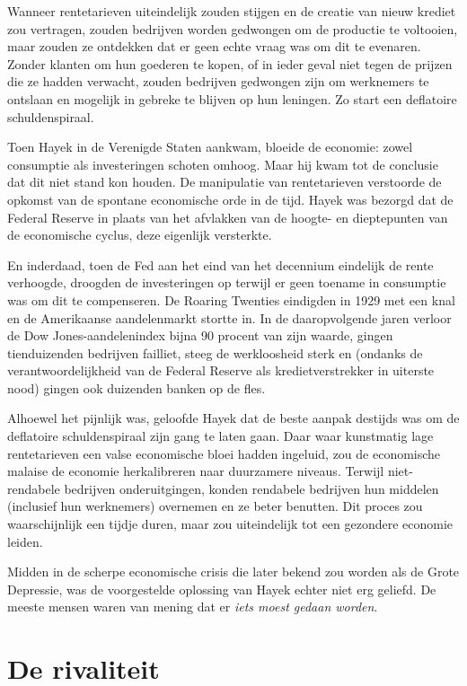 \documentclass[
  a5paper,
  smalldemyvopaper,11pt,twoside,onecolumn,openright,extrafontsizes]{memoir}
\begin{document}
Wanneer rentetarieven uiteindelijk zouden stijgen en de creatie van
nieuw krediet zou vertragen, zouden bedrijven worden gedwongen om de
productie te voltooien, maar zouden ze ontdekken dat er geen echte vraag
was om dit te evenaren. Zonder klanten om hun goederen te kopen, of in
ieder geval niet tegen de prijzen die ze hadden verwacht, zouden
bedrijven gedwongen zijn om werknemers te ontslaan en mogelijk in
gebreke te blijven op hun leningen. Zo start een deflatoire
schuldenspiraal.

Toen Hayek in de Verenigde Staten aankwam, bloeide de economie: zowel
consumptie als investeringen schoten omhoog. Maar hij kwam tot de
conclusie dat dit niet stand kon houden. De manipulatie van
rentetarieven verstoorde de opkomst van de spontane economische orde in
de tijd. Hayek was bezorgd dat de Federal Reserve in plaats van het
afvlakken van de hoogte- en dieptepunten van de economische cyclus, deze
eigenlijk versterkte.

En inderdaad, toen de Fed aan het eind van het decennium eindelijk de
rente verhoogde, droogden de investeringen op terwijl er geen toename in
consumptie was om dit te compenseren. De Roaring Twenties eindigden in
1929 met een knal en de Amerikaanse aandelenmarkt stortte in. In de
daaropvolgende jaren verloor de Dow Jones-aandelenindex bijna 90 procent
van zijn waarde, gingen tienduizenden bedrijven failliet, steeg de
werkloosheid sterk en (ondanks de verantwoordelijkheid van de Federal
Reserve als kredietverstrekker in uiterste nood) gingen ook duizenden
banken op de fles.

Alhoewel het pijnlijk was, geloofde Hayek dat de beste aanpak destijds
was om de deflatoire schuldenspiraal zijn gang te laten gaan. Daar waar
kunstmatig lage rentetarieven een valse economische bloei hadden
ingeluid, zou de economische malaise de economie herkalibreren naar
duurzamere niveaus. Terwijl niet-rendabele bedrijven onderuitgingen,
konden rendabele bedrijven hun middelen (inclusief hun werknemers)
overnemen en ze beter benutten. Dit proces zou waarschijnlijk een tijdje
duren, maar zou uiteindelijk tot een gezondere economie leiden.

Midden in de scherpe economische crisis die later bekend zou worden als
de Grote Depressie, was de voorgestelde oplossing van Hayek echter niet
erg geliefd. De meeste mensen waren van mening dat er \emph{iets moest
gedaan worden}.

\section{De rivaliteit}\label{de-rivaliteit}
\end{document}
